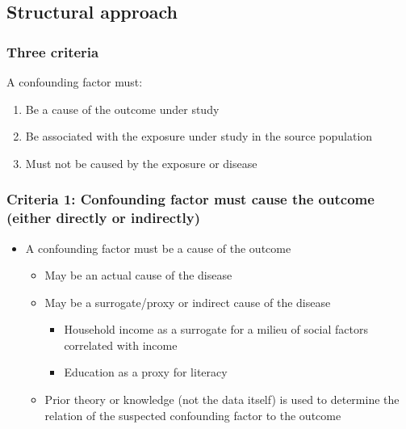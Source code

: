 \documentclass[
]{book}
\providecommand{\tightlist}{%
  \setlength{\itemsep}{0pt}\setlength{\parskip}{0pt}}
\begin{document}
\hypertarget{structural-approach}{%
\subsection{Structural approach}\label{structural-approach}}

\hypertarget{three-criteria}{%
\subsubsection{Three criteria}\label{three-criteria}}

A confounding factor must:

\begin{enumerate}
\def\labelenumi{\arabic{enumi}.}
\tightlist
\item
  Be a cause of the outcome under study
\item
  Be associated with the exposure under study in the source population
\item
  Must not be caused by the exposure or disease
\end{enumerate}

\hypertarget{criteria-1-confounding-factor-must-cause-the-outcome-either-directly-or-indirectly}{%
\subsubsection{Criteria 1: Confounding factor must cause the outcome (either directly or indirectly)}\label{criteria-1-confounding-factor-must-cause-the-outcome-either-directly-or-indirectly}}

\begin{itemize}
\tightlist
\item
  A confounding factor must be a cause of the outcome

  \begin{itemize}
  \tightlist
  \item
    May be an actual cause of the disease
  \item
    May be a surrogate/proxy or indirect cause of the disease

    \begin{itemize}
    \tightlist
    \item
      Household income as a surrogate for a milieu of social factors correlated with income
    \item
      Education as a proxy for literacy
    \end{itemize}
  \item
    Prior theory or knowledge (not the data itself) is used to determine the relation of the suspected confounding factor to the outcome
  \end{itemize}
\end{itemize}
\end{document}
